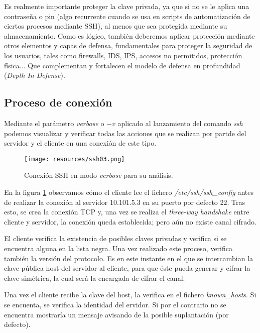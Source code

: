 \documentclass[a4paper, 11pt, titlepage]{article}
\begin{document}
            Es realmente importante proteger la clave privada, ya que si no se le aplica una contraseña o pin 
            (algo recurrente cuando se usa en scripts de automatización de ciertos procesos mediante SSH), al 
            menos que sea protegida mediante su almacenamiento. Como es lógico, también deberemos aplicar protección 
            mediante otros elementos y capas de defensa, fundamentales para proteger la seguridad de los usuarios, 
            tales como firewalls, IDS, IPS, accesos no permitidos, protección física... Que complementan y 
            fortalecen el modelo de defensa en profundidad (\textit{Depth In Defense}).

    \subsection{Proceso de conexión}

        Mediante el parámetro \textit{verbose} o $-v$ aplicado al lanzamiento del comando \textit{ssh} podemos 
        visualizar y verificar todas las acciones que se realizan por partde del servidor y el cliente en una 
        conexión de este tipo.

        \begin{figure}[htp]
            \centering
            \texttt{[image: resources/ssh03.png]}
            \caption{Conexión SSH en modo \textit{verbose} para su análisis.}
            \label{ssh03}
        \end{figure}

        En la figura \ref{ssh03} observamos cómo el cliente lee el fichero \textit{/etc/ssh/ssh\_config} antes 
        de realizar la conexión al servidor 10.101.5.3 en su puerto por defecto 22. Tras esto, se crea la conexión 
        TCP y, una vez se realiza el \textit{three-way handshake} entre cliente y servidor, la conexión queda 
        establecida; pero aún no existe canal cifrado.

        El cliente verifica la existencia de posibles claves privadas y verifica si se encuentra alguna en la 
        lista negra. Una vez realizado este proceso, verifica también la versión del protocolo. Es en este instante 
        en el que se intercambian la clave pública host del servidor al cliente, para que éste pueda generar y 
        cifrar la clave simétrica, la cual será la encargada de cifrar el canal.

        Una vez el cliente recibe la clave del host, la verifica en el fichero \textit{known\_hosts}. Si se encuenta, 
        se verifica la identidad del ervidor. Si por el contrario no se encuentra mostraría un mensaje avisando de 
        la posible suplantación (por defecto).
\end{document}
